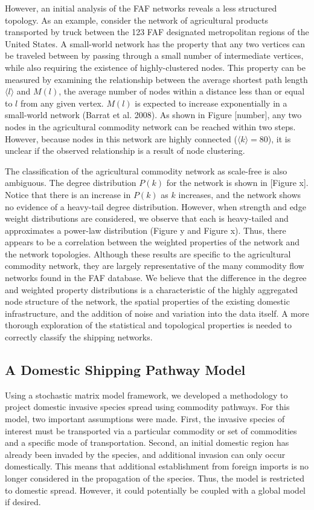 \documentclass[12pt]{article}
\begin{document}
However, an initial analysis of the FAF networks reveals a less structured topology.  As an example, consider the network of agricultural products transported by truck between the 123 FAF designated metropolitan regions of the United States.  A small-world network has the property that any two vertices can be traveled between by passing through a small number of intermediate vertices, while also requiring the existence of highly-clustered nodes.  This property can be measured by examining the relationship between the average shortest path length $\big \langle l \big \rangle$ and $M(l)$, the average number of nodes within a distance less than or equal to $l$ from any given vertex.  $M(l)$ is expected to increase exponentially in a small-world network (Barrat et al. 2008).  As shown in Figure [number], any two nodes in the agricultural commodity network can be reached within two steps.  However, because nodes in this network are highly connected ($\big \langle k \big \rangle = 80$), it is unclear if the observed relationship is a result of node clustering.  

The classification of the agricultural commodity network as scale-free is also ambiguous.  The degree distribution $P(k)$ for the network is shown in [Figure x].  Notice that there is an increase in $P(k)$ as $k$ increases, and the network shows no evidence of a heavy-tail degree distribution.  However, when strength and edge weight distributions are considered, we observe that each is heavy-tailed and approximates a power-law distribution (Figure y and Figure x).  Thus, there appears to be a correlation between the weighted properties of the network and the network topologies.  Although these results are specific to the agricultural commodity network, they are largely representative of the many commodity flow networks found in the FAF database.  We believe that the difference in the degree and weighted property distributions is a characteristic of the highly aggregated node structure of the network, the spatial properties of the existing domestic infrastructure, and the addition of noise and variation into the data itself. A more thorough exploration of the statistical and topological properties is needed to correctly classify the shipping networks.

\subsection*{A Domestic Shipping Pathway Model}

Using a stochastic matrix model framework, we developed a methodology to project domestic invasive species spread using commodity pathways.  For this model, two important assumptions were made.  First, the invasive species of interest must be transported via a particular commodity or set of commodities and a specific mode of transportation.  Second, an initial domestic region has already been invaded by the species, and additional invasion can only occur domestically.  This means that additional establishment from foreign imports is no longer considered in the propagation of the species.  Thus, the model is restricted to domestic spread. However, it could potentially be coupled with a global model if desired.
\end{document}
